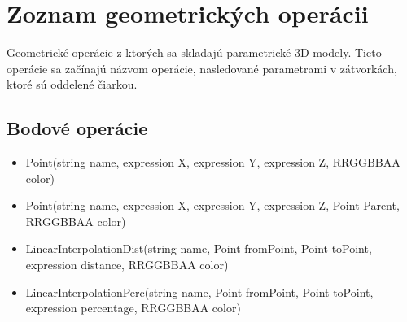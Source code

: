 \chapter{Zoznam geometrických operácii}
\label{Priloha:zoznamGeometrickychOperacii}
Geometrické operácie z ktorých sa skladajú parametrické 3D modely. Tieto operácie sa začínajú názvom operácie, nasledované parametrami v zátvorkách, ktoré sú oddelené čiarkou.

\section{Bodové operácie}
\begin{itemize}


		\item Point(string name, expression X, expression Y, expression Z, RRGGBBAA color) 
		\item Point(string name, expression X, expression Y, expression Z, Point Parent, RRGGBBAA color) 

		\item LinearInterpolationDist(string name, Point fromPoint, Point toPoint, expression distance, RRGGBBAA color)
		
		\item LinearInterpolationPerc(string name, Point fromPoint, Point toPoint, expression percentage, RRGGBBAA color)


\end{itemize}

